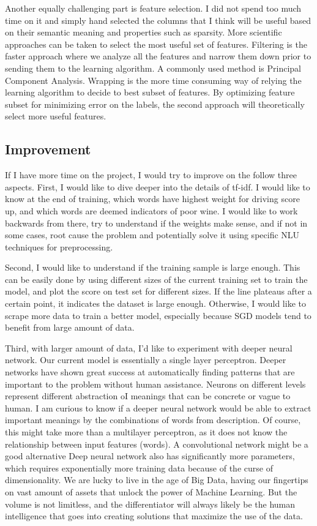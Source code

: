 \documentclass{article}
\begin{document}
Another equally challenging part is feature selection. I did not spend too much time on it and simply hand selected the columns that I think will be useful based on their semantic meaning and properties such as sparsity. More scientific approaches can be taken to select the most useful set of features. Filtering is the faster approach where we analyze all the features and narrow them down prior to sending them to the learning algorithm. A commonly used method is Principal Component Analysis. Wrapping is the more time consuming way of relying the learning algorithm to decide to best subset of features. By optimizing feature subset for minimizing error on the labels, the second approach will theoretically select more useful features.

\subsection{Improvement}
If I have more time on the project, I would try to improve on the follow three aspects. First, I would like to dive deeper into the details of tf-idf. I would like to know at the end of training, which words have highest weight for driving score up, and which words are deemed indicators of poor wine. I would like to work backwards from there, try to understand if the weights make sense, and if not in some cases, root cause the problem and potentially solve it using specific NLU techniques for preprocessing.

Second, I would like to understand if the training sample is large enough. This can be easily done by using different sizes of the current training set to train the model, and plot the score on test set for different sizes. If the line plateaus after a certain point, it indicates the dataset is large enough. Otherwise, I would like to scrape more data to train a better model, especially because SGD models tend to benefit  from large amount of data.

Third, with larger amount of data, I'd like to experiment with deeper neural network. Our current model is essentially a single layer perceptron. Deeper networks have shown great success at automatically finding patterns that are important to the problem without human assistance. Neurons on different levels represent different abstraction oI meanings that can be concrete or vague to human. I am curious to know if a deeper neural network would be able to extract important meanings by the combinations of words from description. Of course, this might take more than a multilayer perceptron, as it does not know the relationship between input features (words). A convolutional network might be a good alternative Deep neural network also has significantly more parameters, which requires exponentially more training data because of the curse of dimensionality. We are lucky to live in the age of Big Data, having our fingertips on vast amount of assets that unlock the power of Machine Learning. But the volume is not limitless, and the differentiator will always likely be the human intelligence that goes into creating solutions that maximize the use of the data.
\end{document}
